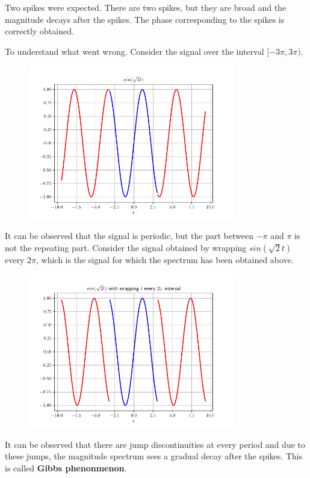 \documentclass[12pt, a4paper]{article}
\begin{document}
Two spikes were expected. There are two spikes, but they are broad and the magnitude decays after the spikes. The phase corresponding to the spikes is correctly obtained.

To understand what went wrong. Consider the signal over the interval $[-3\pi, 3\pi)$.

\begin{figure}[H]
\centering
\includegraphics[width=0.8\textwidth]{ex2.png}
\end{figure}

It can be observed that the signal is periodic, but the part between $-\pi$ and $\pi$ is not the repeating part. Consider the signal obtained by wrapping $sin(\sqrt{2}t)$ every $2\pi$, which is the signal for which the spectrum has been obtained above.

\begin{figure}[H]
\centering
\includegraphics[width=0.8\textwidth]{ex3.png}
\end{figure}

It can be observed that there are jump discontinuities at every period and due to these jumps, the magnitude spectrum sees a gradual decay after the spikes. This is called \textbf{Gibbs phenonmenon}.
\end{document}
